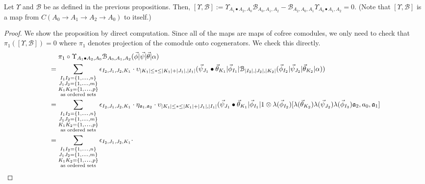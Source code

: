 \begin{prop}
\label{prop:c5}
Let $\Upsilon$ and $\mathcal{B}$ be as 
defined in the previous propositions. 
Then, $[\Upsilon, \mathcal{B}] := 
\Upsilon_{A_1\bullet A_2, A_0} 
\mathcal{B}_{A_0,A_1,A_2} - 
\mathcal{B}_{A_2, A_0, A_1} 
\Upsilon_{A_0 \bullet A_1, A_2} = 0$. 
(Note that $[\Upsilon, \mathcal{B}]$ is 
a map from $C(A_0 \to A_1 \to A_2 \to A_0)$ 
to itself.)
\end{prop}
%
\begin{proof}
We show the proposition by direct computation. 
Since all of the maps are maps of cofree 
comodules, we only need to check that 
$\pi_1([\Upsilon, \mathcal{B}]) = 0$ where 
$\pi_1$ denotes projection of the comodule 
onto cogenerators. We check this directly.
%
\begin{equation*}
\begin{aligned}
&\phantom{{}={}}
\pi_1 \circ \Upsilon_{A_1\bullet A_2, A_0} 
  \mathcal{B}_{A_0,A_1,A_2} 
  (\vec{\phi} | \vec{\psi} | \vec{\theta} | \alpha ) \\
&= 
\sum \limits_{\substack{
  I_1I_2 = \{1,\smdots,n\}\\
  J_1J_2 = \{1,\smdots,m\}\\
  K_1K_2 = \{1,\smdots,p\}\\
  \textrm{as ordered sets}}}
\epsilon_{I_2,J_1,J_2,K_1}\cdot
\upsilon_{|K_1| \leq * \leq |K_1|+|J_1|, |I_1|} (
   \vec{\psi}_{J_1} \bullet \vec{\theta}_{K_1} | 
   \vec{\phi}_{I_1} | 
   \mathcal{B}_{|I_2|, |J_2|, |K_2|} (
   \vec{\phi}_{I_2} | \vec{\psi}_{J_2} | \vec{\theta}_{K_2} | \alpha)) \\
&= 
\sum \limits_{\substack{
  I_1I_2 = \{1,\smdots,n\}\\
  J_1J_2 = \{1,\smdots,m\}\\
  K_1K_2 = \{1,\smdots,p\}\\
  \textrm{as ordered sets}}}
\epsilon_{I_2,J_1,J_2,K_1}\cdot
\eta_{\mathfrak{a}_1, \mathfrak{a}_2} \cdot
\upsilon_{|K_1| \leq * \leq |K_1|+|J_1|, |I_1|} (
   \vec{\psi}_{J_1} \bullet \vec{\theta}_{K_1} | 
   \vec{\phi}_{I_1} |
   1 \otimes \lambda(\vec{\phi}_{I_2})[
     \lambda(\vec{\theta}_{K_2}) \lambda(\vec{\psi}_{J_2}) 
     \lambda(\vec{\phi}_{I_3}) 
     \mathfrak{a}_2, a_0, \mathfrak{a}_1] \\
&= 
\sum \limits_{\substack{
  I_1I_2 = \{1,\smdots,n\}\\
  J_1J_2 = \{1,\smdots,m\}\\
  K_1K_2 = \{1,\smdots,p\}\\
  \textrm{as ordered sets}}}
\epsilon_{I_2,J_1,J_2,K_1}\cdot

\end{aligned}
\end{equation*}
\end{proof}
